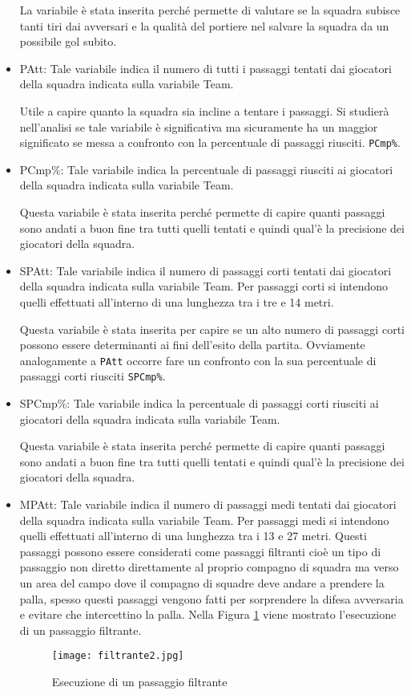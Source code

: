 \begin{itemize}
	La variabile è stata inserita perché permette di valutare se la squadra subisce tanti tiri dai avversari e la qualità del portiere nel salvare la squadra da un possibile gol subito.
	\item \textsf{PAtt}: Tale variabile indica il numero di tutti i passaggi tentati dai giocatori della squadra indicata sulla variabile \textsf{Team}. 
	
	Utile a capire quanto la squadra sia incline a tentare i passaggi. Si studierà nell'analisi se tale variabile è significativa ma sicuramente ha un maggior significato se messa a confronto con la percentuale di passaggi riusciti. \texttt{PCmp\%}.
	\item\textsf{PCmp\%}: Tale variabile indica la percentuale di passaggi riusciti ai giocatori della squadra indicata sulla variabile \textsf{Team}. 
	
	Questa variabile è stata inserita perché permette di capire quanti passaggi sono andati a buon fine tra tutti quelli tentati e quindi qual'è la precisione dei giocatori della squadra.
	\item \textsf{SPAtt}: Tale variabile indica il numero di passaggi corti tentati dai giocatori della squadra indicata sulla variabile \textsf{Team}. Per passaggi corti si intendono quelli effettuati all'interno di una lunghezza tra i tre e 14 metri.
	
	Questa variabile è stata inserita per capire se un alto numero di passaggi corti possono essere determinanti ai fini dell'esito della partita. Ovviamente analogamente a \texttt{PAtt} occorre fare un confronto con la sua percentuale di passaggi corti riusciti \texttt{SPCmp\%}.
	\item \textsf{SPCmp\%}: Tale variabile indica la percentuale di passaggi corti riusciti ai giocatori della squadra indicata sulla variabile \textsf{Team}. 
	
	Questa variabile è stata inserita perché permette di capire quanti passaggi sono andati a buon fine tra tutti quelli tentati e quindi qual'è la precisione dei giocatori della squadra.
	\item \textsf{MPAtt}: Tale variabile indica il numero di passaggi medi tentati dai giocatori della squadra indicata sulla variabile \textsf{Team}. Per passaggi medi si intendono quelli effettuati all'interno di una lunghezza tra i 13 e 27 metri. Questi passaggi possono essere considerati come passaggi filtranti cioè un tipo di passaggio non diretto direttamente al proprio compagno di squadra ma verso un area del campo dove il compagno di squadre deve andare a prendere la palla, spesso questi passaggi vengono fatti per sorprendere la difesa avversaria e evitare che intercettino la palla. Nella Figura \ref{fig:filt} viene mostrato l'esecuzione di un passaggio filtrante.
	\begin{figure}[h]
		\begin{center}
			\texttt{[image: filtrante2.jpg]}
			\caption{Esecuzione di un passaggio filtrante} \label{fig:filt}
		\end{center}
	\end{figure}


\end{itemize}
